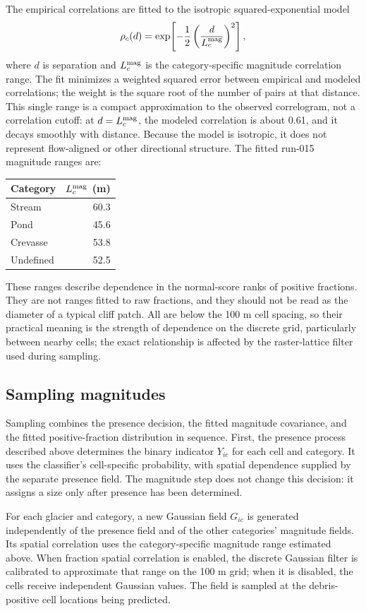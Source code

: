 \documentclass[11pt,a4paper]{article}
\begin{document}
The empirical correlations are fitted to the isotropic squared-exponential
model
\[
 \rho_c(d)=\exp\!\left[-\frac{1}{2}
 \left(\frac{d}{L_c^{\rm mag}}\right)^2\right],
\]
where $d$ is separation and $L_c^{\rm mag}$ is the category-specific magnitude
correlation range. The fit minimizes a weighted squared error between empirical
and modeled correlations; the weight is the square root of the number of pairs
at that distance. This single range is a compact approximation to the observed
correlogram, not a correlation cutoff: at $d=L_c^{\rm mag}$, the modeled
correlation is about 0.61, and it decays smoothly with distance. Because the
model is isotropic, it does not represent flow-aligned or other directional
structure. The fitted run-015 magnitude ranges are:
\begin{center}
\begin{tabular}{lr}
\toprule
Category & $L_c^{\rm mag}$ (m)\\
\midrule
Stream & 60.3\\
Pond & 45.6\\
Crevasse & 53.8\\
Undefined & 52.5\\
\bottomrule
\end{tabular}
\end{center}

These ranges describe dependence in the normal-score ranks of positive
fractions. They are not ranges fitted to raw fractions, and they should not be
read as the diameter of a typical cliff patch. All are below the 100 m cell
spacing, so their practical meaning is the strength of dependence on the
discrete grid, particularly between nearby cells; the exact relationship is
affected by the raster-lattice filter used during sampling.

\subsection{Sampling magnitudes}
Sampling combines the presence decision, the fitted magnitude covariance, and
the fitted positive-fraction distribution in sequence. First, the presence
process described above determines the binary indicator $Y_{ic}$ for each cell
and category. It uses the classifier's cell-specific probability, with spatial
dependence supplied by the separate presence field. The magnitude step does not
change this decision: it assigns a size only after presence has been
determined.

For each glacier and category, a new Gaussian field $G_{ic}$ is generated
independently of the presence field and of the other categories' magnitude
fields. Its spatial correlation uses the category-specific magnitude range
estimated above. When fraction spatial correlation is enabled, the discrete
Gaussian filter is calibrated to approximate that range on the 100 m grid; when
it is disabled, the cells receive independent Gaussian values. The field is
sampled at the debris-positive cell locations being predicted.
\end{document}

